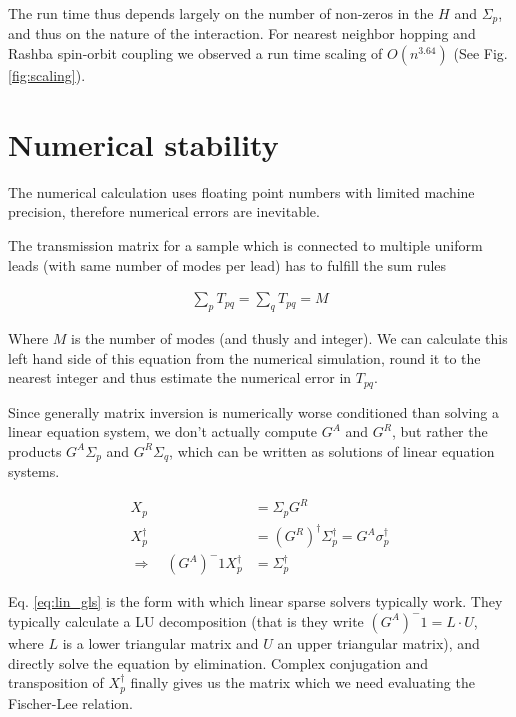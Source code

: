 The run time thus depends largely on the number of non-zeros in the $H$ and
$\Sigma_p$, and thus on the nature of the interaction. For nearest neighbor
hopping and Rashba spin-orbit coupling we observed a run time scaling of
$O(n^{3.64})$ (See Fig. \ref{fig:scaling}).

\section{Numerical stability}

The numerical
calculation uses floating point numbers with limited machine precision,
therefore numerical errors are inevitable.

The transmission matrix for a sample which is connected to multiple uniform
leads (with same number of modes per lead) has to fulfill the sum rules

\begin{align}
    \sum_p T_{pq} = \sum_q T_{pq} = M
    \label{eq:sumrule}
\end{align}

Where $M$ is the number of modes (and thusly and integer). We can calculate
this left hand side of this equation from the numerical simulation, round it
to the nearest integer and thus estimate the numerical error in $T_{pq}$.

Since generally matrix inversion is numerically worse conditioned than solving
a linear equation system\cite{matrixinversion}, we don't actually compute
$G^A$ and $G^R$, but rather the products $G^A\Sigma_p$ and $G^R\Sigma_q$,
which can be written as solutions of linear equation systems.

\begin{align}
    X_p &= \Sigma_p G^R\\
    X_p^\dagger &= (G^R)^\dagger \Sigma_p^\dagger = G^A \sigma_p^\dagger\\
    \Rightarrow\quad (G^A)^-1 X_p^\dagger &= \Sigma_p^\dagger
    \label{eq:lin_gls}
\end{align}

Eq. \ref{eq:lin_gls} is the form with which linear sparse solvers typically
work. They typically calculate a LU decomposition (that is they write
$(G^A)^-1 = L \cdot U$, where $L$ is a lower triangular matrix and $U$ an
upper triangular matrix), and directly solve the equation by elimination.
Complex conjugation and transposition of $X_p^\dagger$ finally gives us the
matrix which we need evaluating the Fischer-Lee relation.

